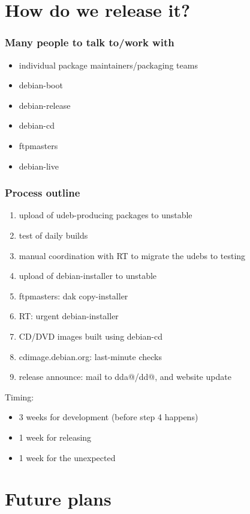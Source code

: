 \documentclass[handout]{beamer}
\begin{document}
\section{How do we release it?}

\begin{frame}[fragile]
  \frametitle{Many people to talk to/work with}
  \begin{itemize}
  \item individual package maintainers/packaging teams
  \item debian-boot
  \item debian-release
  \item debian-cd
  \item ftpmasters
  \item debian-live
  \end{itemize}
\end{frame}

\begin{frame}[fragile]
  \frametitle{Process outline}
  \begin{enumerate}
  \item upload of udeb-producing packages to unstable
  \item test of daily builds
  \item manual coordination with RT to migrate the udebs to testing
  \pause
  \item upload of debian-installer to unstable
  \pause
  \item ftpmasters: dak copy-installer
  \item RT: urgent debian-installer
  \item CD/DVD images built using debian-cd
  \pause
  \item cdimage.debian.org: last-minute checks
  \item release announce: mail to dda@/dd@, and website update
  \end{enumerate}

  \pause
  Timing:
  \begin{itemize}
  \item 3 weeks for development (before step 4 happens)
  \item 1 week for releasing
  \pause
  \item 1 week for the unexpected

  \end{itemize}
\end{frame}


\section{Future plans}
\end{document}
